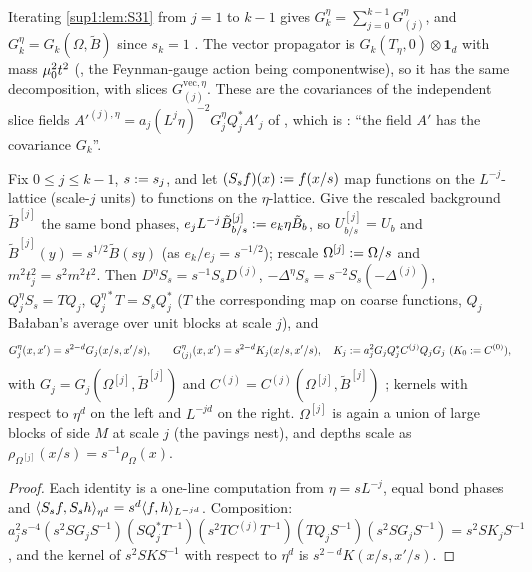 \begin{corollary}\label{sup1:cor:S31}
Iterating \cref{sup1:lem:S31} from $j=1$ to $k-1$ gives $G^\eta_k=\sum_{j=0}^{k-1}G^\eta_{(j)}$, and $G^\eta_k=G_k(\Omega,\tilde B)$ since $s_k=1$ \cite[(2.22)]{Ba1}. The vector propagator is $G_k(T_\eta,0)\otimes\mathbf 1_d$ with mass $\mu_0^2t^2$ (\cite[p.~608]{Ba1}, the Feynman-gauge action \cite[(1.11)]{Ba1} being componentwise), so it has the same decomposition, with slices $G^{\mathrm{vec},\eta}_{(j)}$. These are the covariances of the independent slice fields $A'^{(j),\eta}=a_j(L^j\eta)^{-2}G^\eta_jQ_j^*A'_j$ of \cite[(1.2)]{Ba3}, which is \cite[p.~414]{Ba3}: ``the field $A'$ has the covariance $G_k$''.
\end{corollary}

\begin{lemma}[rescaling]\label{sup1:lem:S32}
Fix $0\le j\le k-1$, $s:= s_j$, and let $(S_sf)(x):= f(x/s)$ map functions on the $L^{-j}$-lattice (scale-$j$ units) to functions on the $\eta$-lattice. Give the rescaled background $\tilde B^{[j]}$ the same bond phases, $e_jL^{-j}\tilde B^{[j]}_{b/s}:= e_k\eta\tilde B_b$, so $U^{[j]}_{b/s}=U_b$ and $\tilde B^{[j]}(y)=s^{1/2}\tilde B(sy)$ (as $e_k/e_j=s^{-1/2}$); rescale $\Omega^{[j]}:=\Omega/s$ and $m^2t_j^2=s^2m^2t^2$. Then $D^\eta S_s=s^{-1}S_sD^{(j)}$, $-\Delta^\eta S_s=s^{-2}S_s(-\Delta^{(j)})$, $Q^\eta_jS_s=TQ_j$, $Q^{\eta*}_jT=S_sQ_j^*$ ($T$ the corresponding map on coarse functions, $Q_j$ Ba{\l}aban's average over unit blocks at scale $j$), and
\[
G^\eta_j(x,x')=s^{2-d}G_j(x/s,x'/s),\qquad G^\eta_{(j)}(x,x')=s^{2-d}K_j(x/s,x'/s),\quad K_j:= a_j^2G_jQ_j^*C^{(j)}Q_jG_j\ (K_0:= C^{(0)}),
\]
with $G_j=G_j(\Omega^{[j]},\tilde B^{[j]})$ \cite[(2.22)]{Ba1} and $C^{(j)}=C^{(j)}(\Omega^{[j]},\tilde B^{[j]})$ \cite[(2.31)]{Ba1}; kernels with respect to $\eta^d$ on the left and $L^{-jd}$ on the right. $\Omega^{[j]}$ is again a union of large blocks of side $M$ at scale $j$ (the pavings nest), and depths scale as $\rho_{\Omega^{[j]}}(x/s)=s^{-1}\rho_\Omega(x)$.
\end{lemma}

\begin{proof}
Each identity is a one-line computation from $\eta=sL^{-j}$, equal bond phases and $\langle S_sf,S_sh\rangle_{\eta^d}=s^d\langle f,h\rangle_{L^{-jd}}$. Composition: $a_j^2s^{-4}(s^2SG_jS^{-1})(SQ_j^*T^{-1})(s^2TC^{(j)}T^{-1})(TQ_jS^{-1})(s^2SG_jS^{-1})=s^2SK_jS^{-1}$, and the kernel of $s^2SKS^{-1}$ with respect to $\eta^d$ is $s^{2-d}K(x/s,x'/s)$.
\end{proof}

